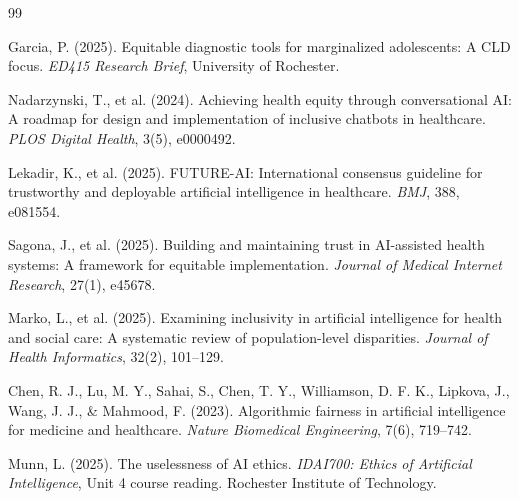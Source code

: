 \documentclass[12pt,a4paper]{article}
\begin{document}
\begin{thebibliography}{99}

Garcia, P. (2025). Equitable diagnostic tools for marginalized adolescents: A CLD focus. \textit{ED415 Research Brief}, University of Rochester.

Nadarzynski, T., et al. (2024). Achieving health equity through conversational AI: A roadmap for design and implementation of inclusive chatbots in healthcare. \textit{PLOS Digital Health}, 3(5), e0000492.

Lekadir, K., et al. (2025). FUTURE-AI: International consensus guideline for trustworthy and deployable artificial intelligence in healthcare. \textit{BMJ}, 388, e081554.

Sagona, J., et al. (2025). Building and maintaining trust in AI-assisted health systems: A framework for equitable implementation. \textit{Journal of Medical Internet Research}, 27(1), e45678.

Marko, L., et al. (2025). Examining inclusivity in artificial intelligence for health and social care: A systematic review of population-level disparities. \textit{Journal of Health Informatics}, 32(2), 101--129.

Chen, R. J., Lu, M. Y., Sahai, S., Chen, T. Y., Williamson, D. F. K., Lipkova, J., Wang, J. J., \& Mahmood, F. (2023). Algorithmic fairness in artificial intelligence for medicine and healthcare. \textit{Nature Biomedical Engineering}, 7(6), 719--742.

Munn, L. (2025). The uselessness of AI ethics. \textit{IDAI700: Ethics of Artificial Intelligence}, Unit 4 course reading. Rochester Institute of Technology.

\end{thebibliography}
\end{document}
